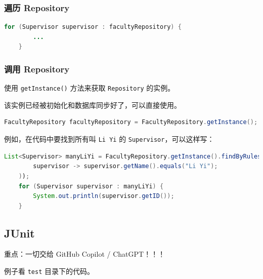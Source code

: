 \documentclass[hyperref,UTF8,12pt,a4paper]{ctexart}
\begin{document}
\subsubsection{遍历 Repository}

\begin{lstlisting}[language=Java]
	for (Supervisor supervisor : facultyRepository) {
		...
	}
\end{lstlisting}

\subsubsection{调用 Repository}

使用 \texttt{getInstance()} 方法来获取 \texttt{Repository} 的实例。

该实例已经被初始化和数据库同步好了，可以直接使用。

\begin{lstlisting}[language=Java]
	FacultyRepository facultyRepository = FacultyRepository.getInstance();
\end{lstlisting}

例如，在代码中要找到所有叫 \texttt{Li Yi} 的 \texttt{Supervisor}，可以这样写：

\begin{lstlisting}[language=Java]
	List<Supervisor> manyLiYi = FacultyRepository.getInstance().findByRules(
		supervisor -> supervisor.getName().equals("Li Yi");
	));
	for (Supervisor supervisor : manyLiYi) {
		System.out.println(supervisor.getID());
	}
\end{lstlisting}

\subsection{JUnit}

重点：一切交给 GitHub Copilot / ChatGPT！！！

例子看 \texttt{test} 目录下的代码。
\end{document}

